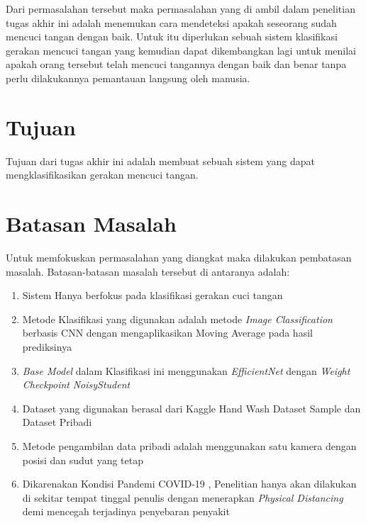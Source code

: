 Dari permasalahan tersebut maka permasalahan yang di ambil dalam penelitian tugas akhir ini adalah menemukan cara mendeteksi apakah seseorang sudah mencuci tangan dengan baik. Untuk itu diperlukan sebuah sistem klasifikasi gerakan mencuci tangan yang kemudian dapat dikembangkan lagi untuk menilai apakah orang tersebut telah mencuci tangannya dengan baik dan benar tanpa perlu dilakukannya pemantauan langsung oleh manusia.

\section{Tujuan}
\label{sec:Tujuan}

Tujuan dari tugas akhir ini adalah membuat sebuah sistem yang dapat mengklasifikasikan gerakan mencuci tangan.

\section{Batasan Masalah}
\label{sec:batasanmasalah}

Untuk memfokuskan permasalahan yang diangkat maka dilakukan pembatasan masalah. Batasan-batasan masalah tersebut di antaranya adalah:

\begin{enumerate}[nolistsep]
	
  \item Sistem Hanya berfokus pada klasifikasi gerakan cuci tangan
  
  \item Metode Klasifikasi yang digunakan adalah metode \emph{Image Classification} berbasis CNN dengan mengaplikasikan Moving Average pada hasil prediksinya 
  
  \item \emph{Base Model} dalam Klasifikasi ini menggunakan \emph{EfficientNet}\cite{cit:effnet} dengan \emph{Weight Checkpoint} \emph{NoisyStudent}\cite{cit:noisy}
  
  \item Dataset yang digunakan berasal dari Kaggle Hand Wash Dataset Sample dan Dataset Pribadi

  \item Metode pengambilan data pribadi adalah menggunakan satu kamera dengan posisi dan sudut yang tetap
  
  \item Dikarenakan Kondisi Pandemi COVID-19 \cite{cit:copid}, Penelitian hanya akan dilakukan di sekitar tempat tinggal penulis dengan menerapkan \emph{Physical Distancing} demi mencegah terjadinya penyebaran penyakit
  
\end{enumerate}

